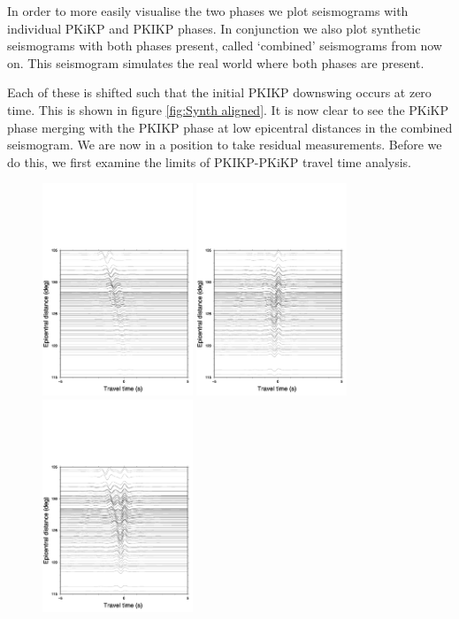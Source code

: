 \documentclass[11pt,a4paper]{article}
\begin{document}
In order to more easily visualise the two phases we plot seismograms with individual PKiKP and PKIKP phases. In conjunction we also plot synthetic seismograms with both phases present, called `combined' seismograms from now on. This seismogram simulates the real world where both phases are present.

Each of these is shifted such that the initial PKIKP downswing occurs at zero time. This is shown in figure \ref{fig:Synth aligned}. It is now clear to see the PKiKP phase merging with the PKIKP phase at low epicentral distances in the combined seismogram. We are now in a position to take residual measurements. Before we do this, we first examine the limits of PKIKP-PKiKP travel time analysis.

\begin{figure}
	\centering
	\includegraphics[width=0.4\textwidth]{figures/celebessea/celebessea_KIK_aligned}
	\includegraphics[width=0.4\textwidth]{figures/celebessea/celebessea_pkikp_aligned}
	\includegraphics[width=0.4\textwidth]{figures/celebessea/celebessea_both_aligned}

\end{figure}
\end{document}
